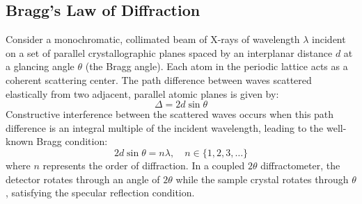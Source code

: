 \documentclass[12pt,a4paper]{article}
\begin{document}
\subsection{Bragg's Law of Diffraction}
Consider a monochromatic, collimated beam of X-rays of wavelength $\lambda$ incident on a set of parallel crystallographic planes spaced by an interplanar distance $d$ at a glancing angle $\theta$ (the Bragg angle). Each atom in the periodic lattice acts as a coherent scattering center. The path difference between waves scattered elastically from two adjacent, parallel atomic planes is given by:
\begin{equation}
    \Delta = 2d \sin\theta
\end{equation}
Constructive interference between the scattered waves occurs when this path difference is an integral multiple of the incident wavelength, leading to the well-known Bragg condition:
\begin{equation}
    2d \sin\theta = n\lambda, \quad n \in \{1, 2, 3, \dots\}
    \label{eq:bragg}
\end{equation}
where $n$ represents the order of diffraction. In a coupled $2\theta$ diffractometer, the detector rotates through an angle of $2\theta$ while the sample crystal rotates through $\theta$, satisfying the specular reflection condition.
\end{document}
